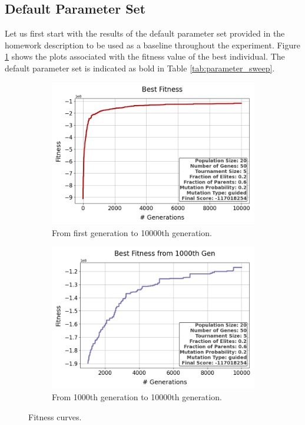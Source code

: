 \documentclass{assignment}
\begin{document}
\subsection{Default Parameter Set}
Let us first start with the results of the default parameter set provided in the homework description to be used as a baseline throughout the experiment. Figure \ref{fig:default} shows the plots associated with the fitness value of the best individual. The default parameter set is indicated as bold in Table \ref{tab:parameter_sweep}.


\begin{figure}[H]
    \begin{subfigure}{0.5\textwidth}
        \includegraphics[width=\textwidth]{figures/best_fitness_output_20_50_5_0.2_0.6_0.2_guided.png}
        \caption{From first generation to 10000th generation.}
    \end{subfigure}\hfill
    \begin{subfigure}{0.5\textwidth}
        \includegraphics[width=\textwidth]{figures/best_fitness_1000_output_20_50_5_0.2_0.6_0.2_guided.png}
        \caption{From 1000th generation to 10000th generation.}
    \end{subfigure}
    \caption{Fitness curves.}
    \label{fig:default}
\end{figure}
\end{document}
